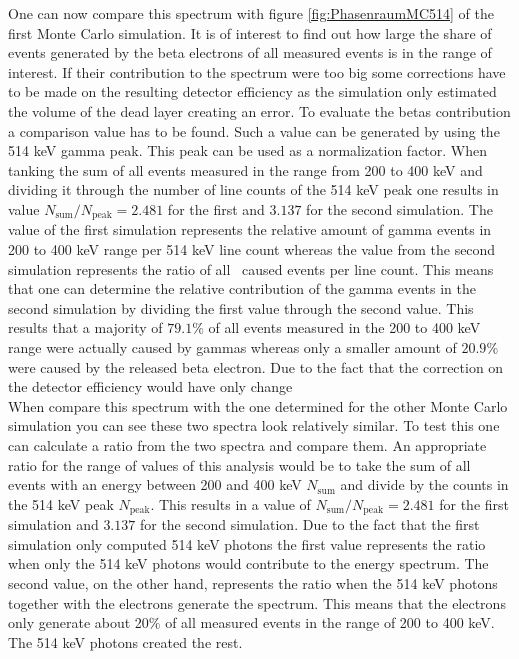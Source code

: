 \documentclass[encoding=utf8,british]{tumphthesis}
\begin{document}
One can now compare this spectrum with figure \ref{fig:PhasenraumMC514} of the first Monte Carlo simulation.
It is of interest to find out how large the share of events generated by the beta electrons of all measured events is in the range of interest.
If their contribution to the spectrum were too big some corrections have to be made on the resulting detector efficiency as the simulation only estimated the volume of the dead layer creating an error.
To evaluate the betas contribution a comparison value has to be found.
Such a value can be generated by using the 514 keV gamma peak.
This peak can be used as a normalization factor.
When tanking the sum of all events measured in the range from 200 to 400 keV and dividing it through the number of line counts of the 514 keV peak one results in value $N_{\mathrm{sum}}/N_{\mathrm{peak}} = 2.481$ for the first and $3.137$  for the second simulation.
The value of the first simulation represents the relative amount of gamma events in 200 to 400 keV range per 514 keV line count whereas the value from the second simulation represents the ratio of all \Kr\ caused events per line count.
This means that one can determine the relative contribution of the gamma events in the second simulation by dividing the first value through the second value.
This results that a majority of $79.1 \%$ of all events measured in the 200 to 400 keV range were actually caused by gammas whereas only a smaller amount of $20.9 \%$ were caused by the released beta electron.
Due to the fact that the correction on the detector efficiency would have only change
\\

When compare this spectrum with the one determined for the other Monte Carlo simulation you can see these two spectra look relatively similar.
To test this one can calculate a ratio from the two spectra and compare them.
An appropriate ratio for the range of values of this analysis would be to take the sum of all events with an energy between 200 and 400 keV $N_{\mathrm{sum}}$ and divide by the counts in the 514 keV peak $N_ {\mathrm{peak}}$.
This results in a value of $N_{\mathrm{sum}}/N_{\mathrm{peak}} = 2.481$ for the first simulation and $3.137$ for the second simulation.
Due to the fact that the first simulation only computed 514 keV photons the first value represents the ratio when only the 514 keV photons would contribute to the energy spectrum.
The second value, on the other hand, represents the ratio when the 514 keV photons together with the electrons generate the spectrum.
This means that the electrons only generate about 20$\%$ of all measured events in the range of 200 to 400 keV.
The 514 keV photons created the rest.
\\
\end{document}
